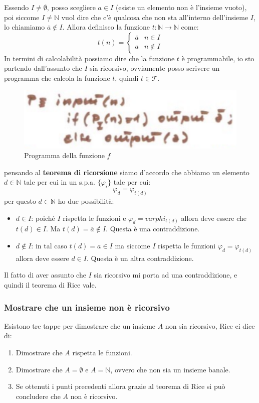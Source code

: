 \documentclass{article}
\begin{document}
Essendo $I\neq\emptyset$, posso scegliere $a\in I$ (esiste un elemento
non è l'insieme vuoto), poi siccome $I\neq\mathbb{N}$ vuol dire che c'è qualcosa che non
sta all'interno dell'insieme $I$, lo chiamiamo $\overline{a}\notin I$.
Allora definisco la funzione $t:\mathbb{N}\rightarrow\mathbb{N}$ come:
\[
    t(n)=
    \begin{cases}
        \overline{a} & n\in I\\
        a & n\notin I
    \end{cases}
\]
In termini di calcolabilità possiamo dire che la funzione $t$ è programmabile,
io sto partendo dall'assunto che $I$ sia ricorsivo, ovviamente posso scrivere un
programma che calcola la funzione $t$, quindi $t\in\mathcal{T}$.
\begin{figure}[H]
   \centering
   \includegraphics[scale=0.6]{images/appartenenza.png}
    \caption{Programma della funzione $f$}
\end{figure}
pensando al \textbf{teorema di ricorsione} siamo d'accordo che abbiamo un elemento $d\in\mathbb{N}$
tale per cui in un s.p.a. $\{\varphi_i\}$ tale per cui:
$$\varphi_d=\varphi_{t(d)}$$
per questo $d\in\mathbb{N}$ ho due possibilità:
\begin{itemize}
    \item $d\in I$: poiché $I$ rispetta le funzioni e $\varphi_d=varphi_{t(d)}$ allora deve
    essere che $t(d)\in I$. Ma $t(d)=\overline{a}\notin I$. Questa è una contraddizione.

    \item $d\notin I$: in tal caso $t(d)=a\in I$ ma siccome $I$ rispetta le funzioni
    $\varphi_d=\varphi_{t(d)}$ allora deve essere $d\in I$. Questa è un altra contraddizione.
\end{itemize}
Il fatto di aver assunto che $I$ sia ricorsivo mi porta ad una contraddizione, e quindi il
teorema di Rice vale.
\subsubsection{Mostrare che un insieme non è ricorsivo}
Esistono tre tappe per dimostrare che un insieme $A$ non sia ricorsivo, Rice ci dice di:
\begin{enumerate}
    \item Dimostrare che $A$ rispetta le funzioni.
    \item Dimostrare che $A=\emptyset$ e $A=\mathbb{N}$, ovvero che non sia un insieme banale.
    \item Se ottenuti i punti precedenti allora grazie al teorema di Rice si può concludere che
    $A$ non è ricorsivo.
\end{enumerate}
\end{document}
